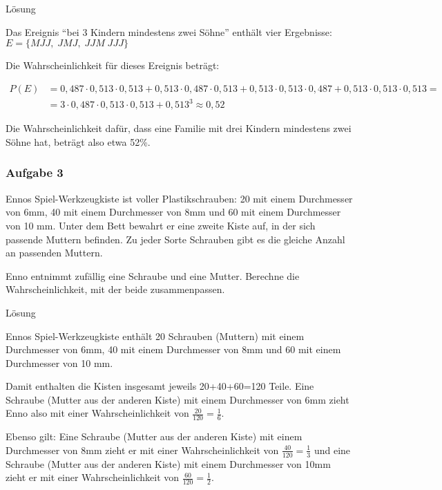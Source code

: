 \documentclass[
  ngerman,
]{book}
\begin{document}
Lösung

Das Ereignis ``bei 3 Kindern mindestens zwei Söhne'' enthält vier Ergebnisse: \(E=\{MJJ,\;JMJ,\;JJM\;JJJ\}\)

Die Wahrscheinlichkeit für dieses Ereignis beträgt:

\[\begin{align}P(E)&=0,487\cdot0,513\cdot0,513+0,513\cdot0,487\cdot0,513+0,513\cdot0,513\cdot0,487+0,513\cdot0,513\cdot0,513=\\
&=3\cdot0,487\cdot0,513\cdot0,513 + 0,513^3\approx 0,52\end{align}\]

Die Wahrscheinlichkeit dafür, dass eine Familie mit drei Kindern mindestens zwei Söhne hat, beträgt also etwa 52\%.

\hypertarget{section-130}{%
\subsubsection*{}\label{section-130}}

\hypertarget{aufgabe-3-7}{%
\subsubsection*{Aufgabe 3}\label{aufgabe-3-7}}

Ennos Spiel-Werkzeugkiste ist voller Plastikschrauben: 20 mit einem Durchmesser von 6mm, 40 mit einem Durchmesser von 8mm und 60 mit einem Durchmesser von 10 mm. Unter dem Bett bewahrt er eine zweite Kiste auf, in der sich passende Muttern befinden. Zu jeder Sorte Schrauben gibt es die gleiche Anzahl an passenden Muttern.

Enno entnimmt zufällig eine Schraube und eine Mutter. Berechne die Wahrscheinlichkeit, mit der beide zusammenpassen.

Lösung

Ennos Spiel-Werkzeugkiste enthält 20 Schrauben (Muttern) mit einem Durchmesser von 6mm, 40 mit einem Durchmesser von 8mm und 60 mit einem Durchmesser von 10 mm.

Damit enthalten die Kisten insgesamt jeweils 20+40+60=120 Teile. Eine Schraube (Mutter aus der anderen Kiste) mit einem Durchmesser von 6mm zieht Enno also mit einer Wahrscheinlichkeit von \(\frac{20}{120}=\frac{1}{6}\).

Ebenso gilt: Eine Schraube (Mutter aus der anderen Kiste) mit einem Durchmesser von 8mm zieht er mit einer Wahrscheinlichkeit von \(\frac{40}{120}=\frac{1}{3}\) und eine Schraube (Mutter aus der anderen Kiste) mit einem Durchmesser von 10mm zieht er mit einer Wahrscheinlichkeit von \(\frac{60}{120}=\frac{1}{2}\).
\end{document}
